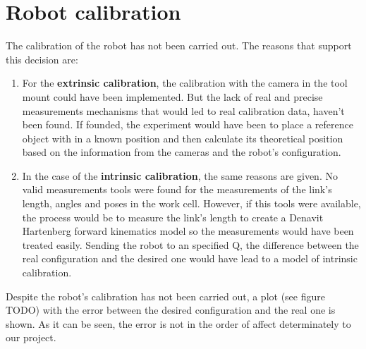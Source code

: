 \section{Robot calibration} %
\label{sec:robot_calibration}
The calibration of the robot has not been carried out. The reasons that support this decision are:
\begin{enumerate}
	\item For the \textbf{extrinsic calibration}, the calibration with the camera in the tool mount could have been implemented. But the lack of real and precise measurements mechanisms that would led to real calibration data, haven't been found. If founded, the experiment would have been to place a reference object with in a known position and then calculate its theoretical position based on the information from the cameras and the robot's configuration.
	\item In the case of the \textbf{intrinsic calibration}, the same reasons are given. No valid measurements tools were found for the measurements of the link's length, angles and poses in the work cell. However, if this tools were available, the process would be to measure the link's length to create a Denavit Hartenberg forward kinematics model so the measurements would have been treated easily. Sending the robot to an specified Q, the difference between the real configuration and the desired one would have lead to a model of intrinsic calibration.
\end{enumerate}

Despite the robot's calibration has not been carried out, a plot (see figure TODO) with the error between the desired configuration and the real one is shown. As it can be seen, the error is not in the order of affect determinately to our project.

